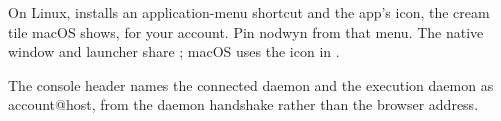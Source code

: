 On Linux, 
installs an application-menu shortcut and the app's icon, the cream tile
macOS shows, for your account. Pin nodwyn from that menu. The native window and launcher share
; macOS uses the icon in .

The console header names the connected daemon and the execution daemon as
account@host, from the daemon handshake rather than the browser address.
